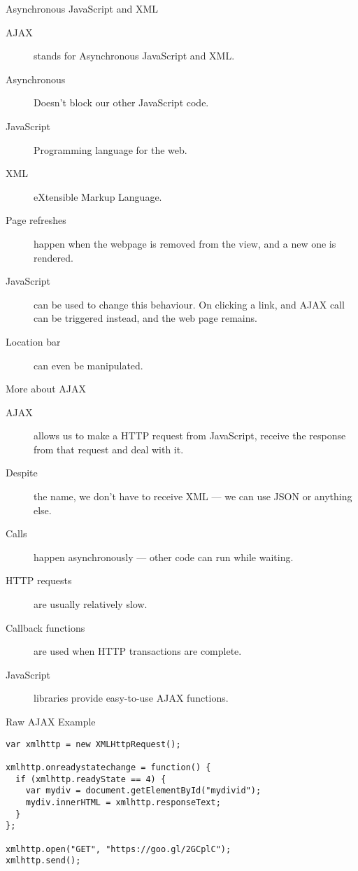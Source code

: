 \documentclass{beamer}
\begin{document}
\begin{frame}{Asynchronous JavaScript and XML}
  
  \begin{description}
    \item[AJAX] stands for Asynchronous JavaScript and XML.
    \item[Asynchronous] Doesn't block our other JavaScript code.
    \item[JavaScript] Programming language for the web.
    \item[XML] eXtensible Markup Language.
    \item[Page refreshes] happen when the webpage is removed from the view, and a new one is rendered.
    \item[JavaScript] can be used to change this behaviour. On clicking a link, and AJAX call can be triggered instead, and the web page remains.
    \item[Location bar] can even be manipulated.
  \end{description}
\end{frame}


\begin{frame}{More about AJAX}
  \begin{description}
    \item[AJAX] allows us to make a HTTP request from JavaScript, receive the response from that request and deal with it.
    \item[Despite] the name, we don't have to receive XML --- we can use JSON or anything else.
    \item[Calls] happen asynchronously --- other code can run while waiting.
    \item[HTTP requests] are usually relatively slow.
    \item[Callback functions] are used when HTTP transactions are complete.
    \item[JavaScript] libraries provide easy-to-use AJAX functions.
  \end{description}
\end{frame}


\begin{frame}[fragile]{Raw AJAX Example}
  \begin{verbatim}
var xmlhttp = new XMLHttpRequest();

xmlhttp.onreadystatechange = function() {
  if (xmlhttp.readyState == 4) {
    var mydiv = document.getElementById("mydivid");
    mydiv.innerHTML = xmlhttp.responseText;
  }
};

xmlhttp.open("GET", "https://goo.gl/2GCplC");
xmlhttp.send();
  \end{verbatim}
\end{frame}
\end{document}
